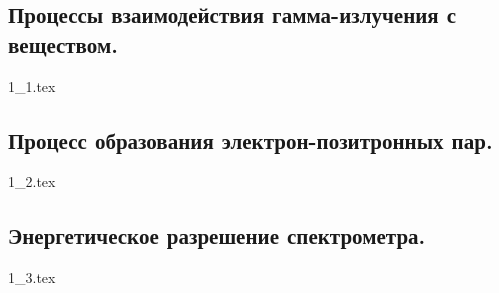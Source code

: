 \subsection{Процессы взаимодействия гамма-излучения с веществом.}
{1_1.tex}

\subsection{Процесс образования электрон-позитронных пар.}
{1_2.tex}

\subsection{Энергетическое разрешение спектрометра.}
{1_3.tex}